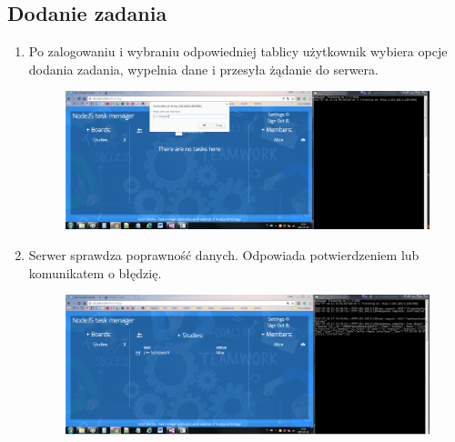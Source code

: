 \documentclass[12pt]{report}
\begin{document}
\begin{enumerate}
\begin{enumerate}
\begin{enumerate}
\subsection{Dodanie zadania}
\begin{enumerate}
\item Po zalogowaniu i wybraniu odpowiedniej tablicy użytkownik wybiera opcje dodania zadania, wypelnia dane i przesyła żądanie do serwera.
\begin{figure}[!t]
\centering
\includegraphics{A1.png}
\end{figure}
\item Serwer sprawdza poprawność danych. Odpowiada potwierdzeniem lub komunikatem o błędzię.
\begin{figure}[!t]
\centering
\includegraphics{A2.png}
\end{figure}
\end{enumerate}


\end{enumerate}
\end{enumerate}
\end{enumerate}
\end{document}
